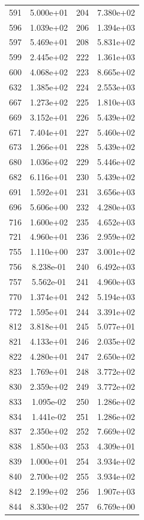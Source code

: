 \documentclass[12pt]{article}
\begin{document}
\begin{longtable}{@{}cccc@{}}
591 & 5.000e+01 & 204 & 7.380e+02 \\
596 & 1.039e+02 & 206 & 1.394e+03 \\
597 & 5.469e+01 & 208 & 5.831e+02 \\
599 & 2.445e+02 & 222 & 1.361e+03 \\
600 & 4.068e+02 & 223 & 8.665e+02 \\
632 & 1.385e+02 & 224 & 2.553e+03 \\
667 & 1.273e+02 & 225 & 1.810e+03 \\
669 & 3.152e+01 & 226 & 5.439e+02 \\
671 & 7.404e+01 & 227 & 5.460e+02 \\
673 & 1.266e+01 & 228 & 5.439e+02 \\
680 & 1.036e+02 & 229 & 5.446e+02 \\
682 & 6.116e+01 & 230 & 5.439e+02 \\
691 & 1.592e+01 & 231 & 3.656e+03 \\
696 & 5.606e+00 & 232 & 4.280e+03 \\
716 & 1.600e+02 & 235 & 4.652e+03 \\
721 & 4.960e+01 & 236 & 2.959e+02 \\
755 & 1.110e+00 & 237 & 3.001e+02 \\
756 & 8.238e-01 & 240 & 6.492e+03 \\
757 & 5.562e-01 & 241 & 4.960e+03 \\
770 & 1.374e+01 & 242 & 5.194e+03 \\
772 & 1.595e+01 & 244 & 3.391e+02 \\
812 & 3.818e+01 & 245 & 5.077e+01 \\
821 & 4.133e+01 & 246 & 2.035e+02 \\
822 & 4.280e+01 & 247 & 2.650e+02 \\
823 & 1.769e+01 & 248 & 3.772e+02 \\
830 & 2.359e+02 & 249 & 3.772e+02 \\
833 & 1.095e-02 & 250 & 1.286e+02 \\
834 & 1.441e-02 & 251 & 1.286e+02 \\
837 & 2.350e+02 & 252 & 7.669e+02 \\
838 & 1.850e+03 & 253 & 4.309e+01 \\
839 & 1.000e+01 & 254 & 3.934e+02 \\
840 & 2.700e+02 & 255 & 3.934e+02 \\
842 & 2.199e+02 & 256 & 1.907e+03 \\
844 & 8.330e+02 & 257 & 6.769e+00 \\

\end{longtable}
\end{document}
